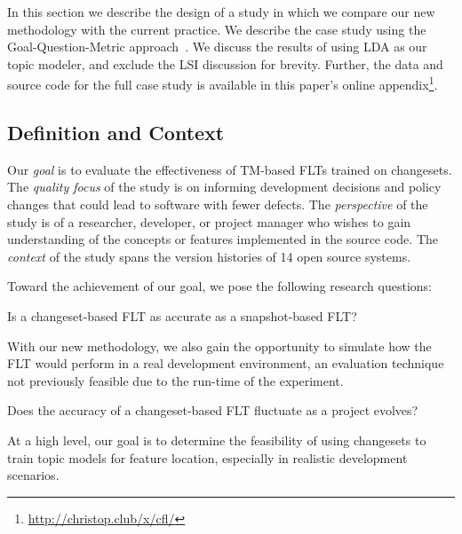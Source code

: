
In this section we describe the design of a study in which we compare our new
methodology with the current practice. We describe the case study using the
Goal-Question-Metric approach~\cite{Basili-etal_1994}. We discuss the results of
using LDA as our topic modeler, and exclude the LSI discussion for brevity.
Further, the data and source code for the full case study is available in this
paper's online appendix\footnote{\url{http://christop.club/x/cfl/}}.

\subsection{Definition and Context}

Our \textit{goal} is to evaluate the effectiveness of TM-based FLTs trained on
changesets. The \textit{quality focus} of the study is on informing development
decisions and policy changes that could lead to software with fewer defects.
The \textit{perspective} of the study is of a researcher, developer, or project
manager who wishes to gain understanding of the concepts or features implemented
in the source code. The \textit{context} of the study spans the version
histories of 14 open source systems.


Toward the achievement of our goal, we pose the following research questions:
\begin{description}[font=\itshape\mdseries,leftmargin=10mm,style=sameline]
    \item[RQ1] Is a changeset-based FLT as accurate as a snapshot-based FLT?
\end{description}

With our new methodology, we also gain the opportunity to simulate how the FLT
would perform in a real development environment, an evaluation technique not
previously feasible due to the run-time of the experiment.

\begin{description}[font=\itshape\mdseries,leftmargin=10mm,style=sameline]
    \item[RQ2] Does the accuracy of a changeset-based FLT fluctuate as a project evolves?
\end{description}

At a high level, our goal is to determine the feasibility of using changesets to
train topic models for feature location, especially in realistic development
scenarios.

